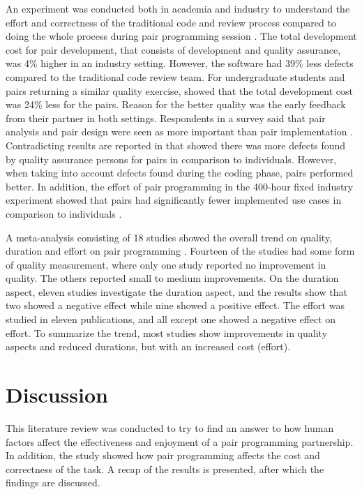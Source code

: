\documentclass[conference]{IEEEtran}
\begin{document}
An experiment was conducted both in academia and industry to understand the effort and correctness of the traditional code and review process compared to doing the whole process during pair programming session \cite{10.1145/1159733.1159749}. The total development cost for pair development, that consists of development and quality assurance, was 4\% higher in an industry setting. However, the software had 39\% less defects compared to the traditional code review team. For undergraduate students and pairs returning a similar quality exercise, showed that the total development cost was 24\% less for the pairs. Reason for the better quality was the early feedback from their partner in both settings. Respondents in a survey said that pair analysis and pair design were seen as more important than pair implementation \cite{Williams2000Strengthening}. Contradicting results are reported in \cite{1541842} that showed there was more defects found by quality assurance persons for pairs in comparison to individuals. However, when taking into account defects found during the coding phase, pairs performed better. In addition, the effort of pair programming in the 400-hour fixed industry experiment showed that pairs had significantly fewer implemented use cases in comparison to individuals \cite{1541842}.

A meta-analysis consisting of 18 studies showed the overall trend on quality, duration and effort on pair programming \cite{Hannay2009effectiveness}. Fourteen of the studies had some form of quality measurement, where only one study reported no improvement in quality. The others reported small to medium improvements. On the duration aspect, eleven studies investigate the duration aspect, and the results show that two showed a negative effect while nine showed a positive effect. The effort was studied in eleven publications, and all except one showed a negative effect on effort. To summarize the trend, most studies show improvements in quality aspects and reduced durations, but with an increased cost (effort). 

\section{Discussion}

This literature review was conducted to try to find an answer to how human factors affect the effectiveness and enjoyment of a pair programming partnership. In addition, the study showed how pair programming affects the cost and correctness of the task. A recap of the results is presented, after which the findings are discussed. 
\end{document}

